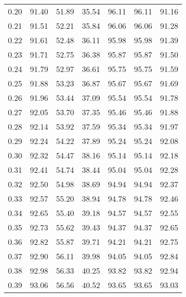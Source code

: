 \begin{tabular}{|c|c|c|c|c|c|c|}
      0.20 &     91.40 &     51.89 &      35.54 &   96.11 &      96.11 &         91.16 \\
      0.21 &     91.51 &     52.21 &      35.84 &   96.06 &      96.06 &         91.28 \\
      0.22 &     91.61 &     52.48 &      36.11 &   95.98 &      95.98 &         91.39 \\
      0.23 &     91.71 &     52.75 &      36.38 &   95.87 &      95.87 &         91.50 \\
      0.24 &     91.79 &     52.97 &      36.61 &   95.75 &      95.75 &         91.59 \\
      0.25 &     91.88 &     53.23 &      36.87 &   95.67 &      95.67 &         91.69 \\
      0.26 &     91.96 &     53.44 &      37.09 &   95.54 &      95.54 &         91.78 \\
      0.27 &     92.05 &     53.70 &      37.35 &   95.46 &      95.46 &         91.88 \\
      0.28 &     92.14 &     53.92 &      37.59 &   95.34 &      95.34 &         91.97 \\
      0.29 &     92.24 &     54.22 &      37.89 &   95.24 &      95.24 &         92.08 \\
      0.30 &     92.32 &     54.47 &      38.16 &   95.14 &      95.14 &         92.18 \\
      0.31 &     92.41 &     54.74 &      38.44 &   95.04 &      95.04 &         92.28 \\
      0.32 &     92.50 &     54.98 &      38.69 &   94.94 &      94.94 &         92.37 \\
      0.33 &     92.57 &     55.20 &      38.94 &   94.78 &      94.78 &         92.46 \\
      0.34 &     92.65 &     55.40 &      39.18 &   94.57 &      94.57 &         92.55 \\
      0.35 &     92.73 &     55.62 &      39.43 &   94.37 &      94.37 &         92.65 \\
      0.36 &     92.82 &     55.87 &      39.71 &   94.21 &      94.21 &         92.75 \\
      0.37 &     92.90 &     56.11 &      39.98 &   94.05 &      94.05 &         92.84 \\
      0.38 &     92.98 &     56.33 &      40.25 &   93.82 &      93.82 &         92.94 \\
      0.39 &     93.06 &     56.56 &      40.52 &   93.65 &      93.65 &         93.03 \\

\end{tabular}
